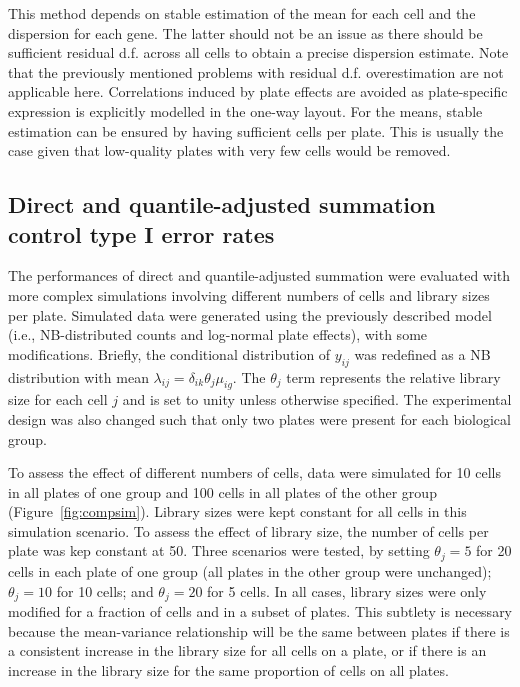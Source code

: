 \documentclass{article}
\begin{document}
This method depends on stable estimation of the mean for each cell and the dispersion for each gene.
The latter should not be an issue as there should be sufficient residual d.f. across all cells to obtain a precise dispersion estimate.
Note that the previously mentioned problems with residual d.f. overestimation are not applicable here.
Correlations induced by plate effects are avoided as plate-specific expression is explicitly modelled in the one-way layout.
For the means, stable estimation can be ensured by having sufficient cells per plate.
This is usually the case given that low-quality plates with very few cells would be removed.

\subsection{Direct and quantile-adjusted summation control type I error rates}
The performances of direct and quantile-adjusted summation were evaluated with more complex simulations involving different numbers of cells and library sizes per plate.
Simulated data were generated using the previously described model (i.e., NB-distributed counts and log-normal plate effects), with some modifications.
Briefly, the conditional distribution of $y_{ij}$ was redefined as a NB distribution with mean $\lambda_{ij} = \delta_{ik}\theta_{j}\mu_{ig}$.
The $\theta_{j}$ term represents the relative library size for each cell $j$ and is set to unity unless otherwise specified.
The experimental design was also changed such that only two plates were present for each biological group.

To assess the effect of different numbers of cells, data were simulated for 10 cells in all plates of one group and 100 cells in all plates of the other group (Figure~\ref{fig:compsim}).
Library sizes were kept constant for all cells in this simulation scenario.
To assess the effect of library size, the number of cells per plate was kep constant at 50.
Three scenarios were tested, by setting $\theta_j=5$ for 20 cells in each plate of one group (all plates in the other group were unchanged);
    $\theta_j=10$ for 10 cells; and $\theta_j=20$ for 5 cells.
In all cases, library sizes were only modified for a fraction of cells and in a subset of plates.
This subtlety is necessary because the mean-variance relationship will be the same between plates if there is a consistent increase in the library size for all cells on a plate, 
    or if there is an increase in the library size for the same proportion of cells on all plates.
\end{document}
